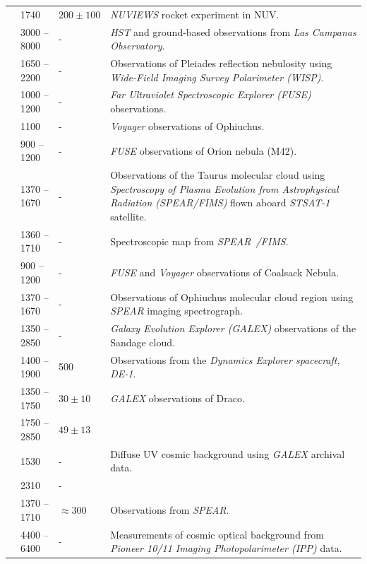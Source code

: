 \documentclass{iau}
\begin{document}
\begin{longtable}{lllp{9cm}}
\citet{Schiminovich2001} & 1740 & $200 \pm 100$ & {\it NUVIEWS} rocket experiment in NUV. \\
\citet{Bernstein2002} & 3000 -- 8000 & - & \textit{HST} and ground-based observations from \textit{Las Campanas Observatory}. \\
\citet{Gibson2003} & 1650 -- 2200 & - & Observations of Pleiades reflection nebulosity using \textit{Wide-Field Imaging Survey Polarimeter (WISP)}. \\
\citet{Murthy_sahnow2004} & 1000 -- 1200 & - & \textit{Far Ultraviolet Spectroscopic Explorer (FUSE)} observations. \\
\citet{Sujatha2005} & 1100 & - & \textit{Voyager} observations of Ophiuchus. \\
\citet{Murthy_Orion2005} & 900 -- 1200 & - & \textit{FUSE} observations of Orion nebula (M42). \\
\citet{Lee2006}  & 1370 -- 1670 & - & Observations of the Taurus molecular cloud using {\it Spectroscopy of Plasma Evolution from Astrophysical Radiation (SPEAR/FIMS)} flown aboard \textit{STSAT-1} satellite. \\
\citet{Edelstein2006} & 1360 -- 1710 & - &  Spectroscopic map from \textit{SPEAR\ /FIMS}. \\  
\citet{Sujatha2007} & 900 -- 1200 & - & \textit{FUSE} and \textit{Voyager} observations of Coalsack Nebula. \\
\citet{Lee2008} & 1370 -- 1670 & - & Observations of Ophiuchus molecular cloud region using \textit{SPEAR} imaging spectrograph. \\
\citet{Sujatha2009} & 1350 -- 2850 & - & {\it Galaxy Evolution Explorer (GALEX)} observations of the Sandage cloud. \\
\cite{Puthiyaveettil2010} & 1400 -- 1900 & 500 & Observations from the \textit{Dynamics Explorer spacecraft, DE-1}. \\
\citet{Sujatha2010} & 1350 -- 1750 & $30 \pm 10$ & \textit{GALEX} observations of Draco. \\
 & 1750 -- 2850 & $49 \pm 13$ & \\
 \citet{Murthy_galex_data2010} & 1530 & - & Diffuse UV cosmic background using \textit{GALEX} archival data. \\
  & 2310 & - & \\
 \citet{Seon2011} & 1370 -- 1710 & $\approx$300 & Observations from \textit{SPEAR}. \\
 \citet{Matsuoka2011} & 4400 -- 6400 & - & Measurements of cosmic optical background from \textit{Pioneer 10/11 Imaging Photopolarimeter (IPP)} data. \\

\end{longtable}
\end{document}
